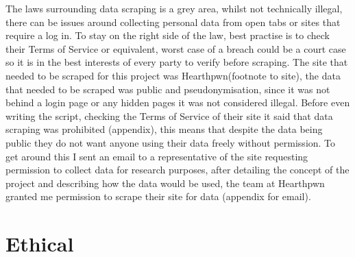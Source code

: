 \documentclass{report} %
\begin{document}
	The laws surrounding data scraping is a grey area, whilst not technically illegal, there can be issues around collecting personal data from open tabs or sites that require a log in. To stay on the right side of the law, best practise is to check their Terms of Service or equivalent, worst case of a breach could be a court case so it is in the best interests of every party to verify before scraping. The site that needed to be scraped for this project was Hearthpwn(footnote to site), the data that needed to be scraped was public and pseudonymisation, since it was not behind a login page or any hidden pages it was not considered illegal. Before even writing the script, checking the Terms of Service of their site it said that data scraping was prohibited (appendix), this means that despite the data being public they do not want anyone using their data freely without permission. To get around this I sent an email to a representative of the site requesting permission to collect data for research purposes, after detailing the concept of the project and describing how the data would be used, the team at Hearthpwn granted me permission to scrape their site for data (appendix for email). 
	
	\section{Ethical} 
	



\end{document}
